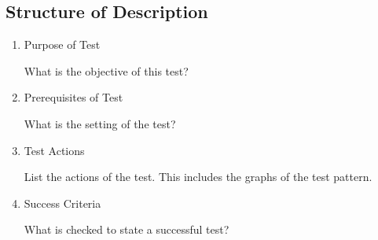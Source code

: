 \documentclass[12pt,a4paper]{report}
\begin{document}
\subsection{Structure of Description}
\begin{enumerate}
  \item Purpose of Test

  What is the objective of this test?
  \item Prerequisites of Test

  What is the setting of the test?
  \item Test Actions

  List the actions of the test. This includes the graphs of the test pattern.
  \item Success Criteria

  What is checked to state a successful test?
\end{enumerate}
\end{document}
